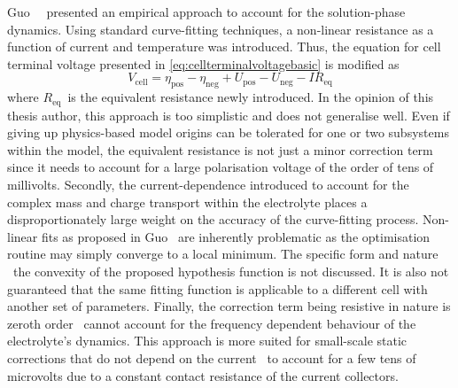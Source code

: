 Guo~\etal~\cite{Guo2011a}  presented an  empirical approach  to account  for the
solution-phase dynamics.  Using standard curve-fitting techniques,  a non-linear
resistance as  a function of current  and temperature was introduced.  Thus, the
equation for cell terminal voltage presented
in \cref{eq:cellterminalvoltagebasic} is modified as
\begin{equation}
    V_\text{cell} = η_\text{pos} - η_\text{neg} + U_\text{pos} - U_\text{neg} - I R_\text{eq}
\end{equation}
where  $R_\text{eq}$~is  the  equivalent  resistance newly  introduced.  In  the
opinion of  this thesis  author, this  approach is too  simplistic and  does not
generalise well. Even if giving up  physics-based model origins can be tolerated
for one  or two subsystems  within the model,  the equivalent resistance  is not
just a minor correction term since it  needs to account for a large polarisation
voltage of  the order  of tens of  millivolts. Secondly,  the current-dependence
introduced  to account  for the  complex mass  and charge  transport within  the
electrolyte  places a  disproportionately large  weight on  the accuracy  of the
curve-fitting process. Non-linear fits as proposed in Guo~\etal{} are inherently
problematic  as  the optimisation  routine may  simply converge  to a  local
minimum.  The  specific  form  and  nature \eg~the  convexity  of  the  proposed
hypothesis  function is  not  discussed.  It is  also  not  guaranteed that  the
same  fitting function  is  applicable  to a  different  cell  with another  set
of  parameters.  Finally, the  correction  term  being  resistive in  nature  is
zeroth order  \ie~cannot account  for the frequency  dependent behaviour  of the
electrolyte's  dynamics. This  approach is  more suited  for small-scale  static
corrections that do not  depend on the current \eg~to account for  a few tens of
microvolts due to a constant contact resistance of the current collectors.


